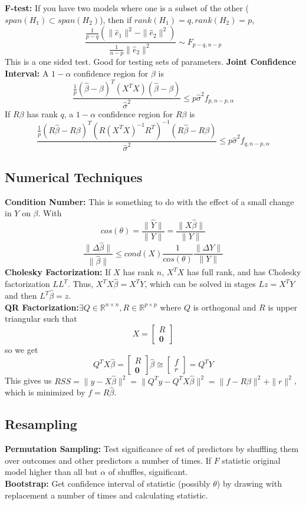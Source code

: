 \documentclass[10pt]{article}
\newcommand{\R}{\mathbb{R}}
\theoremstyle{definition}
\begin{document}
\begin{multicols}{2}
{\bf F-test:} If you have two models where one is a subset of the other (\(span(H_1)\subset span(H_2)\)), then if \(rank(H_1)=q, rank(H_2)=p\),
\[\frac{\frac{1}{p-q}(\|\hat e_1\|^2-\|\hat e_2\|^2)}{\frac{1}{n-p}\|\hat e_2\|^2} \sim F_{p-q,n-p}\]
This is a one sided test. Good for testing sets of parameters.
{\bf Joint Confidence Interval:} A \(1-\alpha\) confidence region for $\beta$ is
\[\frac{\frac{1}{p}(\hat\beta-\beta)^T(X^TX)(\hat\beta-\beta)}{\hat\sigma^2} \leq p\hat\sigma^2 f_{p,n-p,\alpha} \]
If $R\beta$ has rank $q$, a \(1-\alpha\) confidence region for $R\beta$ is
\[\frac{\frac{1}{p}(R\hat\beta-R\beta)^T(R(X^TX)^{-1}R^T)^{-1}(R\hat\beta-R\beta)}{\hat\sigma^2} \leq p\hat\sigma^2 f_{q,n-p,\alpha} \]

\subsection{Numerical Techniques} 
{\bf Condition Number:} This is something to do with the effect of a small change in $Y$ on $\beta$. With
\[cos(\theta)=\frac{\|\hat Y\|}{\|Y\|} = \frac{\|X\hat\beta\|}{\|Y\|} \]
\[\frac{\|\Delta\hat\beta\|}{\|\hat\beta\|} \leq cond(X)\frac{1}{cos(\theta)}\frac{\|\Delta Y\|}{\|Y\|} \]
{\bf Cholesky Factorization:} If $X$ has rank $n$, $X^TX$ has full rank, and has Cholesky factorization $LL^T$. Thus, $X^TX\hat\beta=X^TY$, which can be solved in stages $Lz=X^TY$ and then $L^T\hat\beta=z$. \\
{\bf QR Factorization:}$\exists Q\in\R^{n\times n}, R\in\R^{p\times p}$ where $Q$ is orthogonal and $R$ is upper triangular such that 
\[X=\left[\begin{array}{c} R\\ \mathbf{0}\end{array} \right] \]
so we get
\[Q^TX\hat\beta = \left[\begin{array}{c} R\\ \mathbf{0}\end{array} \right] \hat\beta \cong \left[\begin{array}{c} f\\ r \end{array} \right] = Q^TY \]
This gives us \(RSS = \|y-X\hat\beta\|^2 = \|Q^Ty-Q^TX\hat\beta\|^2 = \|f-R\hat\beta\|^2 + \|r\|^2 \), which is minimized by \(f=R\hat\beta\).

\subsection{Resampling} 
{\bf Permutation Sampling:} Test significance of set of predictors by shuffling them over outcomes and other predictors a number of times. If $F$ statistic original model higher than all but $\alpha$ of shuffles, significant. \\
{\bf Bootstrap:} Get confidence interval of statistic (possibly $\theta$) by drawing with replacement a number of times and calculating statistic.


\end{multicols}
\end{document}
